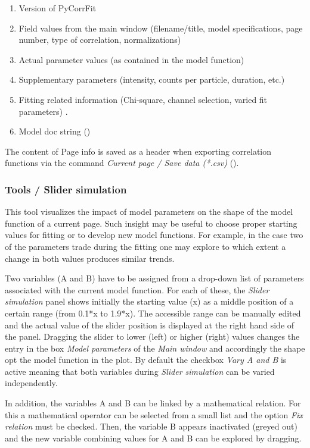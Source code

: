 \begin{enumerate}
\item Version of PyCorrFit
\item Field values from the main window (filename/title, model specifications, page number, type of correlation, normalizations)
\item Actual parameter values (as contained in the model function)
\item Supplementary parameters (intensity, counts per particle, duration, etc.)
\item Fitting related information (Chi-square, channel selection, varied fit parameters) .
\item Model doc string ()
\end{enumerate}
The content of Page info is saved as a header when exporting correlation functions via the command \textit{Current page / Save data (*.csv)} ().

\subsubsection{Tools / Slider simulation}
\label{sec:menub.tools.slide}
This tool visualizes the impact of model parameters on the shape of the model function of a current page. Such insight may be useful to choose proper starting values for fitting or to develop new model functions. For example, in the case two of the parameters trade during the fitting one may explore to which extent a change in both values produces similar trends.

Two variables (A and B) have to be assigned from a drop-down list of parameters associated with the current model function. For each of these, the \textit{Slider simulation} panel shows initially the starting value (x) as a middle position of a certain range (from 0.1*x to 1.9*x). The accessible range can be manually edited and the actual value of the slider position is displayed at the right hand side of the panel. Dragging the slider to lower (left) or higher (right) values changes the entry in the box \textit{Model parameters} of the \textit{Main window} and accordingly the shape opt the model function in the plot. By default the checkbox \textit{Vary A and B}\textit{ }is active meaning that both variables during \textit{Slider simulation} can be varied independently. 

In addition, the variables A and B can be linked by a mathematical relation. For this a mathematical operator can be selected from a small list and the option \textit{Fix relation} must be checked. Then, the variable B appears inactivated (greyed out) and the new variable combining values for A and B can be explored by dragging.

